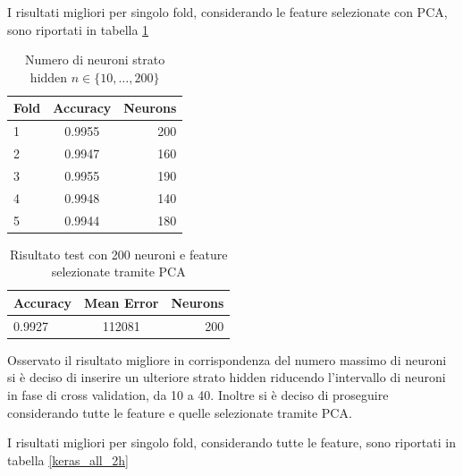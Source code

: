 \documentclass[12pt]{report}
\begin{document}
\par\null\par
\par\null\par

I risultati migliori per singolo fold, considerando le feature selezionate con PCA, sono riportati in tabella \ref{keras_pca}

\begin{table}[H]
\begin{center}
\begin{tabular}{lcr}
\toprule
Fold & Accuracy & Neurons \\
\midrule
1 & 0.9955 & 200\\
2 & 0.9947 & 160\\
3 & 0.9955 & 190\\
4 & 0.9948 & 140\\
5 & 0.9944 & 180\\
\bottomrule
\end{tabular}
\end{center}
\caption{Numero di neuroni strato hidden $n \in \{10, \dots, 200 \}$}
\label{keras_pca}
\end{table}

\begin{table}[H]
\begin{center}
\begin{tabular}{lcr}
\toprule
Accuracy & Mean Error & Neurons \\
\midrule
0.9927 & 112081 & 200\\
\bottomrule
\end{tabular}
\end{center}
\caption{Risultato test con 200 neuroni e feature selezionate tramite PCA}
\label{keras_pca_test}
\end{table}

\par\null\par

Osservato il risultato migliore in corrispondenza del numero massimo di neuroni si è deciso di inserire un ulteriore strato hidden riducendo l'intervallo di neuroni in fase di cross validation, da 10 a 40.
Inoltre si è deciso di proseguire considerando tutte le feature e quelle selezionate tramite PCA.

I risultati migliori per singolo fold, considerando tutte le feature, sono riportati in tabella \ref{keras_all_2h}

\par\null\par
\end{document}

